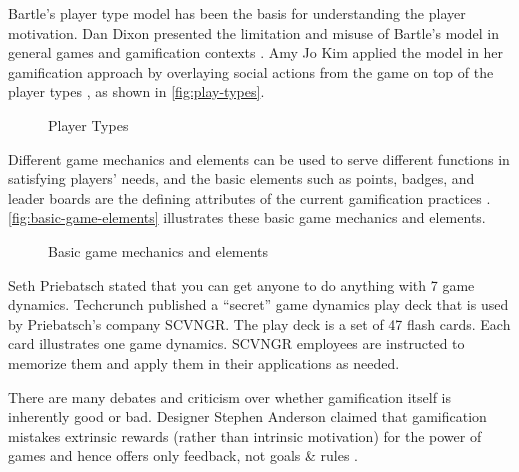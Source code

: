 Bartle's player type model has been the basis for understanding the player motivation. Dan Dixon presented the limitation and misuse of Bartle's model in general games and gamification contexts \cite{DixonPlayerType}. Amy Jo Kim applied the model in her gamification approach by overlaying social actions from the game on top of the player types \cite {Kim2010}, as shown in \autoref{fig:play-types}.

\begin{figure}[ht!]
	\centering
		\caption{Player Types}
		\label{fig:play-types}
\end{figure}

Different game mechanics and elements can be used to serve different functions in satisfying players' needs, and the basic elements such as points, badges, and leader boards are the defining attributes of the current gamification practices \cite {Deterding2011dragon}. \autoref{fig:basic-game-elements}  illustrates these basic game mechanics and elements.

\begin{figure}[ht!]
	\centering
		\caption{Basic game mechanics and elements}
		\label{fig:basic-game-elements}
\end{figure}

Seth Priebatsch \cite {Priebatsch2010ted} stated that you can get anyone to do anything with 7 game dynamics. Techcrunch \cite{Biggs2010} published a ``secret'' game dynamics play deck that is used by Priebatsch's company SCVNGR. The play deck is a set of 47 flash cards. Each card illustrates one game dynamics. SCVNGR employees are instructed to memorize them and apply them in their applications as needed.  

There are many debates and criticism over whether gamification itself is inherently good or bad. Designer Stephen Anderson claimed that gamification mistakes extrinsic rewards (rather than intrinsic motivation) for the power of games and hence offers only feedback, not goals \& rules \cite {anderson2011}. 

